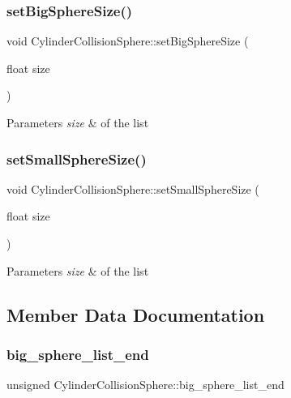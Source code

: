 \subsubsection{\texorpdfstring{set\+Big\+Sphere\+Size()}{setBigSphereSize()}}
{\footnotesize\ttfamily void Cylinder\+Collision\+Sphere\+::set\+Big\+Sphere\+Size (\begin{DoxyParamCaption}\item[{float}]{size }\end{DoxyParamCaption})}


\begin{DoxyParams}{Parameters}
{\em size} & of the list \\
\hline
\end{DoxyParams}
\mbox{\label{class_cylinder_collision_sphere_a6e7f5ff8f4e5c076edb5f1cbee433a34}} 
\subsubsection{\texorpdfstring{set\+Small\+Sphere\+Size()}{setSmallSphereSize()}}
{\footnotesize\ttfamily void Cylinder\+Collision\+Sphere\+::set\+Small\+Sphere\+Size (\begin{DoxyParamCaption}\item[{float}]{size }\end{DoxyParamCaption})}


\begin{DoxyParams}{Parameters}
{\em size} & of the list \\
\hline
\end{DoxyParams}


\subsection{Member Data Documentation}
\mbox{\label{class_cylinder_collision_sphere_a303b3843a9c8ab9ae3e6f4cce85ae8e0}} 
\subsubsection{\texorpdfstring{big\+\_\+sphere\+\_\+list\+\_\+end}{big\_sphere\_list\_end}}
{\footnotesize\ttfamily unsigned Cylinder\+Collision\+Sphere\+::big\+\_\+sphere\+\_\+list\+\_\+end}


